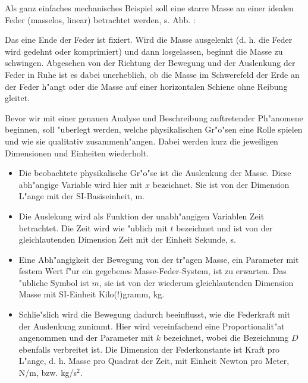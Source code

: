
\begin{MIntro}
Als ganz einfaches mechanisches Beispiel soll eine starre Masse an einer idealen Feder (masselos, linear) betrachtet werden, s. Abb. :

\begin{center}
  \end{center}

Das eine Ende der Feder ist fixiert. Wird die Masse ausgelenkt (d. h. die Feder wird gedehnt oder komprimiert) und dann losgelassen, beginnt die Masse zu schwingen. Abgesehen von der Richtung der Bewegung und der Auslenkung der Feder in Ruhe ist es dabei unerheblich, ob die Masse im Schwerefeld der Erde an der Feder h"angt oder die Masse auf einer horizontalen Schiene ohne Reibung gleitet. 

Bevor wir mit einer genauen Analyse und Beschreibung auftretender Ph"anomene beginnen, soll "uberlegt werden, welche physikalischen Gr"o"sen eine Rolle spielen und wie sie qualitativ zusammenh"angen. Dabei werden kurz die jeweiligen Dimensionen und Einheiten wiederholt.

\begin{itemize}
  \item Die beobachtete physikalische Gr"o"se ist die Auslenkung der Masse. Diese abh"angige Variable wird hier mit $x$ bezeichnet. Sie ist von der Dimension L"ange mit der SI-Basiseinheit, m.
  \item Die Auslekung wird als Funktion der unabh"angigen Variablen Zeit betrachtet. Die Zeit wird wie "ublich mit $t$ bezeichnet und ist von der gleichlautenden Dimension Zeit mit der Einheit Sekunde, s.
  \item Eine Abh"angigkeit der Bewegung von der tr"agen Masse, ein Parameter mit festem Wert f"ur ein gegebenes Masse-Feder-System, ist zu erwarten. Das "ubliche Symbol ist $m$, sie ist von der wiederum gleichlautenden Dimension Masse mit SI-Einheit Kilo(!)gramm, kg.
  \item Schlie"slich wird die Bewegung dadurch beeinflusst, wie die Federkraft mit der Auslenkung zunimmt. Hier wird vereinfachend eine Proportionalit"at angenommen und der Parameter mit $k$ bezeichnet, wobei die Bezeichnung $D$ ebenfalls verbreitet ist. Die Dimension der Federkonstante ist Kraft pro L"ange, d. h. Masse pro Quadrat der Zeit, mit Einheit Newton pro Meter, N/m, bzw. kg/s$^2$.
\end{itemize}


\end{MIntro}
